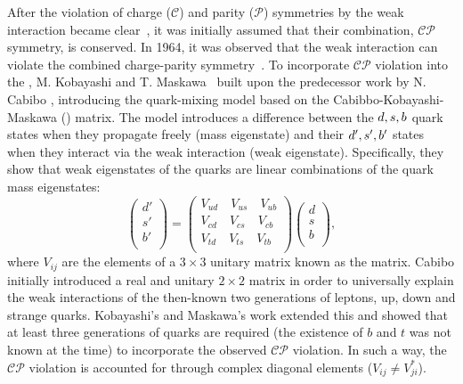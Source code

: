 After the violation of charge ($\mathcal{C}$) and parity ($\mathcal{P}$) symmetries by the weak interaction became clear~\cite{Wu:1957my},
it was initially assumed that their combination, $\mathcal{CP}$ symmetry, is conserved.
In 1964, it was observed that the weak interaction can violate the combined charge-parity symmetry~\cite{Christenson:1964fg}.
To incorporate $\mathcal{CP}$ violation into the \SM, M. Kobayashi and T. Maskawa~\cite{Kobayashi:1973fv} built upon the predecessor work by N. Cabibo \cite{Cabibbo:1963yz},
introducing the quark-mixing model based on the Cabibbo-Kobayashi-Maskawa (\CKM) matrix. 
The model introduces a difference between the $d,s,b$ quark states when they propagate freely (mass eigenstate) and their $d',s',b'$ states when they interact
via the weak interaction (weak eigenstate).
Specifically, they show that weak eigenstates of the quarks are linear combinations of the quark mass eigenstates:
\begin{equation}
    \begin{pmatrix}
        d'\\
        s'\\
        b'\\
    \end{pmatrix}
    =
    \begin{pmatrix}
        V_{ud} \quad V_{us} \quad V_{ub}\\
        V_{cd} \quad V_{cs} \quad V_{cb}\\
        V_{td} \quad V_{ts} \quad V_{tb}\\
    \end{pmatrix}
    \begin{pmatrix}
        d\\
        s\\
        b\\
    \end{pmatrix},
\end{equation}
where $V_{ij}$ are the elements of a $3\times3$ unitary matrix known as the \CKM matrix.
Cabibo initially introduced a real and unitary $2\times2$ matrix in order to universally explain the weak interactions of
the then-known two generations of leptons, up, down and strange quarks.
Kobayashi's and Maskawa's work extended this and showed that at least three generations of quarks are required 
(the existence of $b$ and $t$ was not known at the time) to incorporate the observed $\mathcal{CP}$ violation.
In such a way, the $\mathcal{CP}$ violation is accounted for through complex diagonal elements ($V_{ij}\neq V_{ji}^*$).

